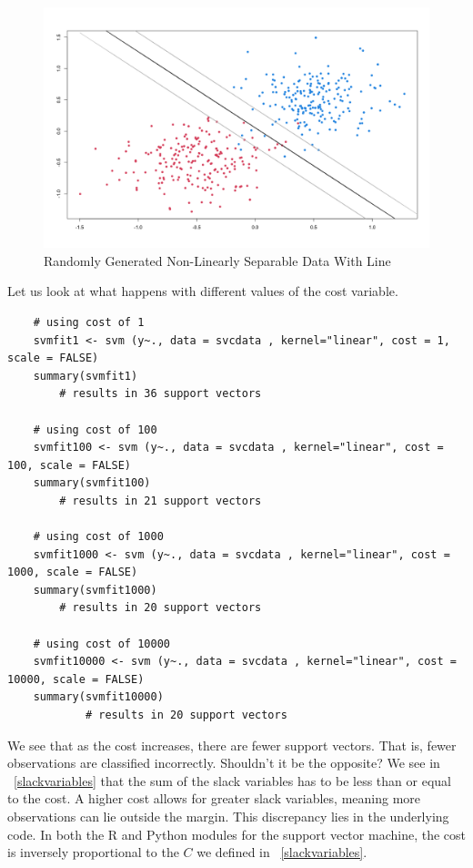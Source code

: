 \documentclass[12pt]{article}
\begin{document}
\begin{figure}[ht]
    \centering
    \includegraphics[width=5in]{Figures/svc/svc_data_w_hyperplanes.png}
    \caption{Randomly Generated Non-Linearly Separable Data With Line}
    \label{fig_svc_data_w_hyperplanes}
\end{figure}

Let us look at what happens with different values of the cost variable.

\begin{verbatim}
    # using cost of 1
    svmfit1 <- svm (y~., data = svcdata , kernel="linear", cost = 1, scale = FALSE)
    summary(svmfit1)
        # results in 36 support vectors
    
    # using cost of 100
    svmfit100 <- svm (y~., data = svcdata , kernel="linear", cost = 100, scale = FALSE)
    summary(svmfit100)
        # results in 21 support vectors
        
    # using cost of 1000
    svmfit1000 <- svm (y~., data = svcdata , kernel="linear", cost = 1000, scale = FALSE)
    summary(svmfit1000)
        # results in 20 support vectors
    
    # using cost of 10000
    svmfit10000 <- svm (y~., data = svcdata , kernel="linear", cost = 10000, scale = FALSE)
    summary(svmfit10000)
            # results in 20 support vectors
\end{verbatim}

We see that as the cost increases, there are fewer support vectors. That is, fewer observations are classified incorrectly. Shouldn't it be the opposite? We see in ~\ref{slackvariables} that the sum of the slack variables has to be less than or equal to the cost. A higher cost allows for greater slack variables, meaning more observations can lie outside the margin. This discrepancy lies in the underlying code. In both the R and Python modules for the support vector machine, the cost is inversely proportional to the \(C\) we defined in ~\ref{slackvariables}.
\end{document}
